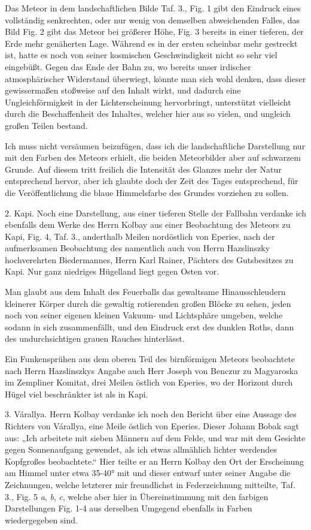 \documentclass[a4paper, 11pt, oneside, german]{article}
\begin{document}
Das Meteor in dem landschaftlichen Bilde Taf. 3., Fig. 1 gibt den Eindruck eines vollständig senkrechten, oder nur wenig von demselben abweichenden Falles, das Bild Fig. 2 gibt das Meteor bei größerer Höhe, Fig. 3 bereits in einer tieferen, der Erde mehr genäherten Lage. Während es in der ersten scheinbar mehr gestreckt ist, hatte es noch von seiner kosmischen Geschwindigkeit nicht so sehr viel eingebüßt. Gegen das Ende der Bahn zu, wo bereits unser irdischer atmosphärischer Widerstand überwiegt, könnte man sich wohl denken, dass dieser gewissermaßen stoßweise auf den Inhalt wirkt, und dadurch eine Ungleichförmigkeit in der Lichterscheinung hervorbringt, unterstützt vielleicht durch die Beschaffenheit des Inhaltes, welcher hier aus so vielen, und ungleich großen Teilen bestand.

Ich muss nicht versäumen beizufügen, dass ich die landschaftliche Darstellung nur mit den Farben des Meteors erhielt, die beiden Meteorbilder aber auf schwarzem Grunde. Auf diesem tritt freilich die Intensität des Glanzes mehr der Natur entsprechend hervor, aber ich glaubte doch der Zeit des Tages entsprechend, für die Veröffentlichung die blaue Himmelsfarbe des Grundes vorziehen zu sollen.

2. Kapi. Noch eine Darstellung, aus einer tieferen Stelle der Fallbahn verdanke ich ebenfalls dem Werke des Herrn Kolbay aus einer Beobachtung des Meteors zu Kapi, Fig. 4, Taf. 3., anderthalb Meilen nordöstlich von Eperies, nach der aufmerksamen Beobachtung des namentlich auch von Herrn Hazslinszky hochverehrten Biedermannes, Herrn Karl Rainer, Pächters des Gutsbesitzes zu Kapi. Nur ganz niedriges Hügelland liegt gegen Osten vor.

Man glaubt aus dem Inhalt des Feuerballs das gewaltsame Hinausschleudern kleinerer Körper durch die gewaltig rotierenden großen Blöcke zu sehen, jeden noch von seiner eigenen kleinen Vakuum- und Lichtsphäre umgeben, welche sodann in sich zusammenfällt, und den Eindruck erst des dunklen Roths, dann des undurchsichtigen grauen Rauches hinterlässt.

Ein Funkensprühen aus dem oberen Teil des birnförmigen Meteors beobachtete nach Herrn Hazslinszkys Angabe auch Herr Joseph von Benczur zu Magyaroska im Zempliner Komitat, drei Meilen östlich von Eperies, wo der Horizont durch Hügel viel beschränkter ist als in Kapi.

3. Várallya. Herrn Kolbay verdanke ich noch den Bericht über eine Aussage des Richters von Várallya, eine Meile östlich von Eperies. Dieser Johann Bobak sagt aus: „Ich arbeitete mit sieben Männern auf dem Felde, und war mit dem Gesichte gegen Sonnenaufgang gewendet, als ich etwas allmählich lichter werdendes Kopfgroßes beobachtete.“ Hier teilte er an Herrn Kolbay den Ort der Erscheinung am Himmel unter etwa 35-40° mit und dieser entwarf unter seiner Angabe die Zeichnungen, welche letzterer mir freundlichst in Federzeichnung mitteilte, Taf. 3., Fig. 5 \emph{a}, \emph{b}, \emph{c}, welche aber hier in Übereinstimmung mit den farbigen Darstellungen Fig. 1-4 aus derselben Umgegend ebenfalls in Farben wiedergegeben sind.
\end{document}
